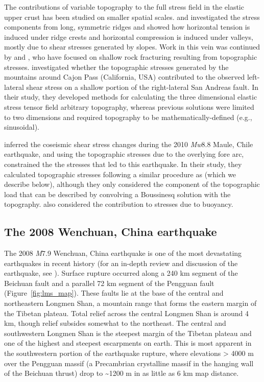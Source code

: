 \documentclass[twocolumn,jgrga]{AGUTeX}
\begin{document}
\begin{article}
The contributions of variable topography to the full stress field in the
elastic upper crust has been studied on smaller spatial scales.
\citet{mctiguemei1981} and \citet{savageswolfs1986} investigated the stress
components from long, symmetric ridges and showed how horizontal tension is
induced under ridge crests and horizontal compression is induced under valleys,
mostly due to shear stresses generated by slopes. Work in this vein was
continued by \citet{millerdunne1996} and \citet{martel2006}, who have focused
on shallow rock fracturing resulting from topographic stresses.
\citet{liuzoback1992} investigated whether the topographic stresses generated
by the mountains around Cajon Pass (California, USA) contributed to the
observed left-lateral shear stress on a shallow portion of the right-lateral
San Andreas fault. In their study, they developed methods for calculating the
three dimensional elastic stress tensor field arbitrary topography, whereas
previous solutions were limited to two dimensions and required topography to be
mathematically-defined (e.g., sinusoidal).

\citet{luttrell2011} inferred the coseismic shear stress changes during the
2010 \emph{Mw}8.8 Maule, Chile earthquake, and using the topographic stresses
due to the overlying fore arc, constrained the the stresses that led to this
earthquake. In their study, they calculated topographic stresses following a
similar procedure as \citet{liuzoback1992} (which we describe below), although
they only considered the component of the topographic load that can be
described by convolving a Boussinesq solution with the topography.
\citet{luttrell2011} also considered the contribution to stresses due to
buoyancy.

\subsection{The 2008 Wenchuan, China
earthquake}\label{the-2008-wenchuan-china-earthquake}

The 2008 \emph{M}7.9 Wenchuan, China earthquake is one of the most devastating
earthquakes in recent history (for an in-depth review and discussion of the
earthquake, see \citet{zhang2010}).  Surface rupture occurred along a 240 km
segment of the Beichuan fault and a parallel 72 km segment of the Pengguan
fault \citep{xu2009} (Figure~\ref{fig:lms_map}). These faults lie at the base
of the central and northeastern Longmen Shan, a mountain range that forms the
eastern margin of the Tibetan plateau. Total relief across the central Longmen
Shan is around 4 km, though relief subsides somewhat to the northeast.  The
central and southwestern Longmen Shan is the steepest margin of the Tibetan
plateau \citep{clarkroyden2000} and one of the highest and steepest escarpments
on earth. This is most apparent in the southwestern portion of the earthquake
rupture, where elevations \textgreater{} 4000 m over the Pengguan massif (a
Precambrian crystalline massif in the hanging wall of the Beichuan thrust) drop
to \textasciitilde{}1200 m in as little as 6 km map distance.


\end{article}
\end{document}
